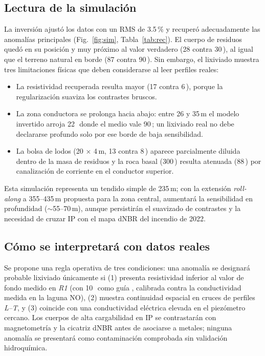 \subsection{Lectura de la simulación}
La inversión ajustó los datos con un RMS de 3.5\,\% y recuperó adecuadamente las anomalías principales (Fig.~\ref{fig:sim}, Tabla~\ref{tab:rec}). El cuerpo de residuos quedó en su posición y muy próximo al valor verdadero (28 contra 30\,\ohmm), al igual que el terreno natural en borde (87 contra 90\,\ohmm). Sin embargo, el lixiviado muestra tres limitaciones físicas que deben considerarse al leer perfiles reales:
\begin{itemize}
\item La resistividad recuperada resulta mayor (17 contra 6\,\ohmm), porque la regularización suaviza los contrastes bruscos.
\item La zona conductora se prolonga hacia abajo: entre 26 y 35\,m el modelo invertido arroja 22\,\ohmm\ donde el medio vale 90\,\ohmm; un lixiviado real no debe declararse profundo solo por ese borde de baja sensibilidad.
\item La bolsa de lodos (20 $\times$ 4\,m, 13 contra 8\,\ohmm) aparece parcialmente diluida dentro de la masa de residuos y la roca basal (300\,\ohmm) resulta atenuada (88\,\ohmm) por canalización de corriente en el conductor superior.
\end{itemize}
Esta simulación representa un tendido simple de 235\,m; con la extensión \emph{roll-along} a 355--435\,m propuesta para la zona central, aumentará la sensibilidad en profundidad ($\sim$55--70\,m), aunque persistirán el suavizado de contrastes y la necesidad de cruzar IP con el mapa dNBR del incendio de 2022.

\subsection{Cómo se interpretará con datos reales}
Se propone una regla operativa de tres condiciones: una anomalía se designará probable lixiviado únicamente si (1) presenta resistividad inferior al valor de fondo medido en \emph{R1} (con 10\,\ohmm\ como guía \cite{abdulrahman2016}, calibrada contra la conductividad medida en la laguna NO), (2) muestra continuidad espacial en cruces de perfiles \emph{L--T}, y (3) coincide con una conductividad eléctrica elevada en el piezómetro cercano. Los cuerpos de alta cargabilidad en IP se contrastarán con magnetometría y la cicatriz dNBR antes de asociarse a metales; ninguna anomalía se presentará como contaminación comprobada sin validación hidroquímica.

